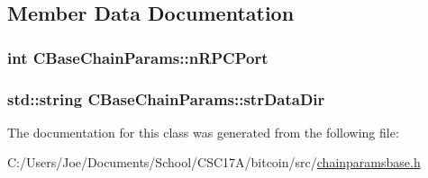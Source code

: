 \subsection{Member Data Documentation}
\hypertarget{class_c_base_chain_params_ae020d8f669175bcac3ab44f9c095c977}{}
\subsubsection[{n\+R\+P\+C\+Port}]{\setlength{\rightskip}{0pt plus 5cm}int C\+Base\+Chain\+Params\+::n\+R\+P\+C\+Port\hspace{0.3cm}{\ttfamily [protected]}}\label{class_c_base_chain_params_ae020d8f669175bcac3ab44f9c095c977}
\hypertarget{class_c_base_chain_params_af5868778f8c6c676aabc9fb2366d2447}{}
\subsubsection[{str\+Data\+Dir}]{\setlength{\rightskip}{0pt plus 5cm}std\+::string C\+Base\+Chain\+Params\+::str\+Data\+Dir\hspace{0.3cm}{\ttfamily [protected]}}\label{class_c_base_chain_params_af5868778f8c6c676aabc9fb2366d2447}


The documentation for this class was generated from the following file\+:\begin{DoxyCompactItemize}
\item 
C\+:/\+Users/\+Joe/\+Documents/\+School/\+C\+S\+C17\+A/bitcoin/src/\hyperlink{chainparamsbase_8h}{chainparamsbase.\+h}\end{DoxyCompactItemize}
